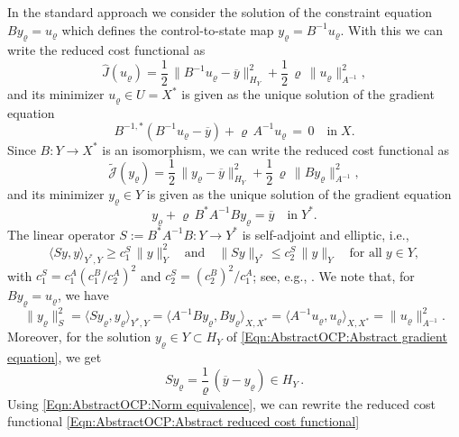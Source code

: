 \documentclass{article}
\numberwithin{equation}{section}
\begin{document}
In the standard approach we consider the solution of the constraint equation
$B y_\varrho = u_\varrho$ which defines the control-to-state map
$y_\varrho = B^{-1}u_\varrho$. With this we can write the reduced
cost functional as
\[
  \widehat{J}(u_\varrho) =
  \frac{1}{2} \, \| B^{-1} u_\varrho - \overline{y} \|^2_{H_Y}
  + \frac{1}{2} \, \varrho \, \| u_\varrho \|^2_{A^{-1}},
\]
and its minimizer $u_\varrho \in U=X^*$ is given as the unique solution of the
gradient equation
\[
  B^{-1,*} (B^{-1} u_\varrho - \overline{y}) +
  \varrho \, A^{-1} u_\varrho \, = \, 0 \quad \mbox{in} \; X  .
\]
Since $B : Y \to X^*$ is an isomorphism, we can write the reduced cost
functional as
\begin{equation}\label{Eqn:AbstractOCP:Abstract reduced cost functional}
  \widetilde{\mathcal{J}}(y_\varrho) = \frac{1}{2} \,
  \| y_\varrho - \overline{y} \|_{H_Y}^2 + \frac{1}{2} \, \varrho \,
  \| B y_\varrho \|^2_{A^{-1}},
\end{equation}
and its minimizer $y_\varrho \in Y$ is given as the unique solution of
the gradient equation
\begin{equation}\label{Eqn:AbstractOCP:Abstract gradient equation}
  y_\varrho + \varrho \, B^* A^{-1} B y_\varrho = \overline{y} \quad
  \mbox{in} \; Y^* .
\end{equation}
The linear operator $S := B^* A^{-1} B : Y \to Y^*$ is self-adjoint
and elliptic, i.e.,
\[
  \langle S y , y \rangle_{Y^*,Y} \geq c_1^S \, \| y \|_Y^2 \quad
  \text{and} \quad
  \| S y \|_{Y^*} \leq c_2^S \, \| y \|_Y \quad \mbox{for all} \;
  y \in Y, %
\]
with $c_1^S = c_1^A (c_1^B / c_2^A)^2$ and $c_2^S = (c_2^B)^2 / c_1^A$;
see, e.g., \cite[Lemma 1]{LangerSteinbachYang:2024ACOM}.
We note that, for $By_\varrho=u_\varrho$, we have
\begin{equation}\label{Eqn:AbstractOCP:Norm equivalence}
  \| y_\varrho \|_S^2 = \langle S y_\varrho , y_\varrho \rangle_{Y^*,Y} =
  \langle A^{-1} B y_\varrho , B y_\varrho \rangle_{X,X^*} =
  \langle A^{-1} u_\varrho , u_\varrho \rangle_{X,X^*} =
  \| u_\varrho \|_{A^{-1}}^2.
\end{equation}
Moreover, for the solution $y_\varrho \in Y \subset H_Y$ of
\eqref{Eqn:AbstractOCP:Abstract gradient equation}, we get
\begin{equation}\label{Eqn:AbstractOCP:Abstract regularity Su}
S y_\varrho = \frac{1}{\varrho} \, (\overline{y}-y_\varrho) \in H_Y \, .
\end{equation}
Using \eqref{Eqn:AbstractOCP:Norm equivalence}, we can rewrite the reduced
cost functional \eqref{Eqn:AbstractOCP:Abstract reduced cost functional}
\end{document}
